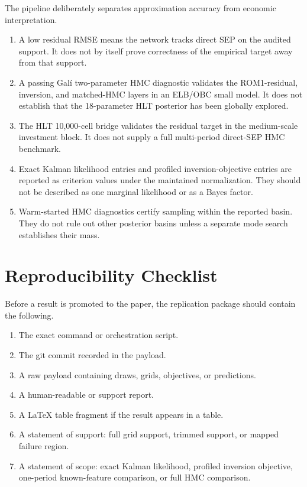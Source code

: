 \documentclass[12pt]{article}
\begin{document}
The pipeline deliberately separates approximation accuracy from economic
interpretation.
\begin{enumerate}[leftmargin=2em,itemsep=0.25em]
\item A low residual RMSE means the network tracks direct SEP on the audited
      support. It does not by itself prove correctness of the empirical target away from that
      support.
\item A passing Gal\'i two-parameter HMC diagnostic validates the
      ROM1-residual, inversion, and matched-HMC layers in an ELB/OBC small
      model. It does not establish that the 18-parameter HLT posterior has been
      globally explored.
\item The HLT 10,000-cell bridge validates the residual target in the
      medium-scale investment block. It does not supply a full multi-period
      direct-SEP HMC benchmark.
\item Exact Kalman likelihood entries and profiled inversion-objective entries
      are reported as criterion values under the maintained normalization. They
      should not be described as one marginal likelihood or as a Bayes factor.
\item Warm-started HMC diagnostics certify sampling within the reported basin.
      They do not rule out other posterior basins unless a separate mode search
      establishes their mass.
\end{enumerate}

\section{Reproducibility Checklist}
\label{apptech:checklist}

Before a result is promoted to the paper, the replication package should contain
the following.
\begin{enumerate}[leftmargin=2em,itemsep=0.25em]
\item The exact command or orchestration script.
\item The git commit recorded in the payload.
\item A raw  payload containing draws, grids, objectives, or
      predictions.
\item A human-readable  or support report.
\item A LaTeX table fragment if the result appears in a table.
\item A statement of support: full grid support, trimmed support, or mapped
      failure region.
\item A statement of scope: exact Kalman likelihood, profiled inversion objective,
      one-period known-feature comparison, or full HMC comparison.
\end{enumerate}
\end{document}
